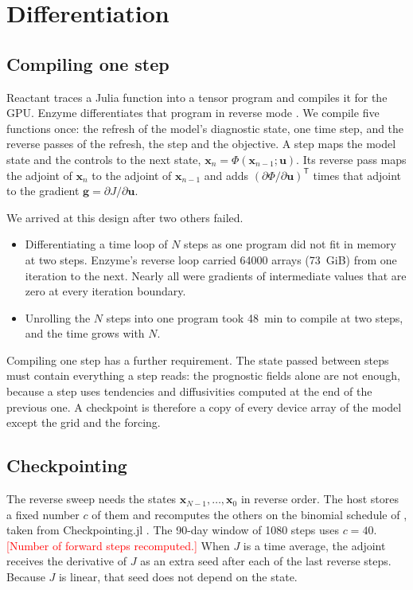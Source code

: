 \documentclass[11pt]{article}
\newcommand{\gvec}{\mathbf{g}}
\newcommand{\xx}{\mathbf{x}}
\newcommand{\uu}{\mathbf{u}}
\newcommand{\pending}[1]{\textcolor{red}{[#1]}}
\begin{document}
\section{Differentiation}
\label{sec:method}

\subsection{Compiling one step}

Reactant traces a Julia function into a tensor program and compiles it for the GPU. Enzyme differentiates that
program in reverse mode \citep{moses2020, moses2021}. We compile five functions once: the refresh of the model's
diagnostic state, one time step, and the reverse passes of the refresh, the step and the objective. A step maps the
model state and the controls to the next state, $\xx_n = \Phi(\xx_{n-1}; \uu)$. Its reverse pass maps the adjoint
of $\xx_n$ to the adjoint of $\xx_{n-1}$ and adds $(\partial\Phi/\partial\uu)^{\mathsf T}$ times that adjoint to
the gradient $\gvec = \partial J/\partial\uu$.

We arrived at this design after two others failed.
\begin{itemize}
  \item Differentiating a time loop of $N$ steps as one program did not fit in memory at two steps. Enzyme's
        reverse loop carried \num{64000} arrays (\SI{73}{GiB}) from one iteration to the next. Nearly all were
        gradients of intermediate values that are zero at every iteration boundary.
  \item Unrolling the $N$ steps into one program took \SI{48}{min} to compile at two steps, and the time grows
        with $N$.
\end{itemize}
Compiling one step has a further requirement. The state passed between steps must contain everything a step
reads: the prognostic fields alone are not enough, because a step uses tendencies and diffusivities computed at the
end of the previous one. A checkpoint is therefore a copy of every device array of the model except the grid and
the forcing.

\subsection{Checkpointing}

The reverse sweep needs the states $\xx_{N-1}, \dots, \xx_0$ in reverse order. The host stores a fixed number $c$ of
them and recomputes the others on the binomial schedule of \citet{griewank2000}, taken from Checkpointing.jl
\citep{schanen2023}. The 90-day window of 1080 steps uses $c = 40$. \pending{Number of forward steps recomputed.}
When $J$ is a time average, the adjoint receives the derivative of $J$ as an extra seed after each of the last
reverse steps. Because $J$ is linear, that seed does not depend on the state.
\end{document}
